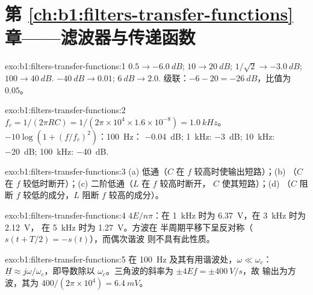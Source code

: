\section*{第 \ref{ch:b1:filters-transfer-functions} 章——滤波器与传递函数}

\begin{solution}{exo:b1:filters-transfer-functions:1}
$0.5 \to \qty{-6.0}{dB}$; $10 \to \qty{20}{dB}$; $1/\sqrt2 \to \qty{-3.0}{dB}$;
$100 \to \qty{40}{dB}$. $\qty{-40}{dB} \to 0.01$; $\qty{+6}{dB} \to 2.0$.
级联：$-6 - 20 = \qty{-26}{dB}$，比值为 $0.05$。
\end{solution}

\begin{solution}{exo:b1:filters-transfer-functions:2}
$f_c = 1/(2\pi RC) = 1/(2\pi \times 10^4 \times 1.6\times10^{-8}) =
\qty{1.0}{kHz}$。 $-10\log(1 + (f/f_c)^2)$：\qty{100}{Hz}：
\qty{-0.04}{dB}; \qty{1}{kHz}: \qty{-3}{dB}; \qty{10}{kHz}: \qty{-20}{dB};
\qty{100}{kHz}: \qty{-40}{dB}.
\end{solution}

\begin{solution}{exo:b1:filters-transfer-functions:3}
(a) 低通（$C$ 在 $f$ 较高时使输出短路）；(b) （$C$
在 $f$ 较低时断开）；(c) 二阶低通（$L$ 在 $f$ 较高时断开，
$C$ 使其短路）；(d) （$C$ 阻断 $f$ 较低的成分，$L$ 阻断 $f$ 较高的成分）。
\end{solution}

\begin{solution}{exo:b1:filters-transfer-functions:4}
$4E/n\pi$：在 \qty{1}{kHz} 时为 \qty{6.37}{V}，在 \qty{3}{kHz} 时为 \qty{2.12}{V}，
在 \qty{5}{kHz} 时为 \qty{1.27}{V}。方波在
半周期平移下呈反对称（$s(t + T/2) = -s(t)$），而偶次谐波
则不具有此性质。
\end{solution}

\begin{solution}{exo:b1:filters-transfer-functions:5}
在 \qty{100}{Hz} 及其有用谐波处，$\omega \ll \omega_c$：
$\underline H \approx j\omega/\omega_c$，即导数除以
$\omega_c$。三角波的斜率为 $\pm 4Ef = \pm\qty{400}{V/s}$，故
输出为方波，其为 $400/(2\pi \times 10^4) =
\qty{6.4}{mV}$。
\end{solution}

